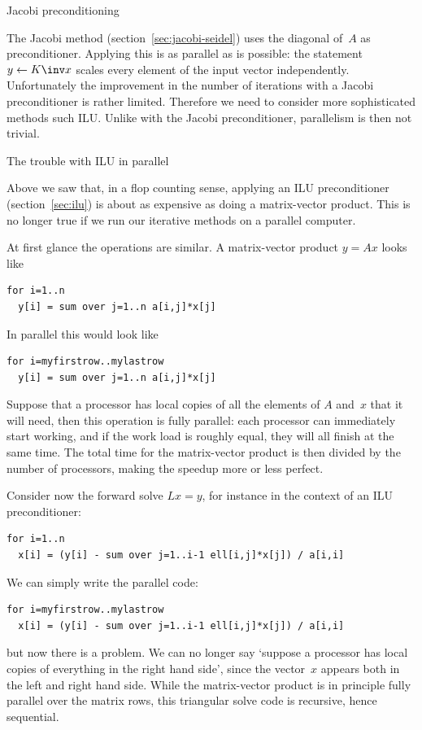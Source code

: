  {Jacobi preconditioning}

The Jacobi method (section~\ref{sec:jacobi-seidel}) uses the diagonal
of~$A$ as preconditioner. Applying this is as parallel as is
possible: the statement $y\leftarrow K\inv x$ scales every element of
the input vector independently. Unfortunately the improvement in the
number of iterations with a Jacobi preconditioner is rather
limited. Therefore we need to consider more sophisticated methods such
\ac{ILU}. Unlike with the Jacobi preconditioner, parallelism is then
not trivial.

 {The trouble with ILU in parallel}

Above we saw that, in a flop counting sense, applying an ILU
preconditioner (section~\ref{sec:ilu}) is about as expensive as doing
a matrix-vector product. This is no longer true if we run our
iterative methods on a parallel computer.

At first glance the operations are similar. A matrix-vector product
$y=Ax$ looks like
\begin{verbatim}
for i=1..n
  y[i] = sum over j=1..n a[i,j]*x[j]
\end{verbatim}
In parallel this would look like
\begin{verbatim}
for i=myfirstrow..mylastrow
  y[i] = sum over j=1..n a[i,j]*x[j]
\end{verbatim}
Suppose that a processor has local copies of all the elements of $A$
and~$x$ that it will need, then this operation is fully parallel: each
processor can immediately start working, and if the work load is
roughly equal, they will all finish at the same time. The total time
for the matrix-vector product is then divided by the number of
processors, making the speedup more or less perfect.

Consider now the forward solve $Lx=y$, for instance in the context of
an \ac{ILU} preconditioner:
\begin{verbatim}
for i=1..n
  x[i] = (y[i] - sum over j=1..i-1 ell[i,j]*x[j]) / a[i,i]
\end{verbatim}
We can simply write the parallel code:
\begin{verbatim}
for i=myfirstrow..mylastrow
  x[i] = (y[i] - sum over j=1..i-1 ell[i,j]*x[j]) / a[i,i]
\end{verbatim}
but now there is a problem. We can no longer say `suppose a processor
has local copies of everything in the right hand side', since the
vector~$x$ appears both in the left and right hand side. While the
matrix-vector product is in principle fully parallel over the matrix
rows, this triangular solve code is recursive, hence sequential.

